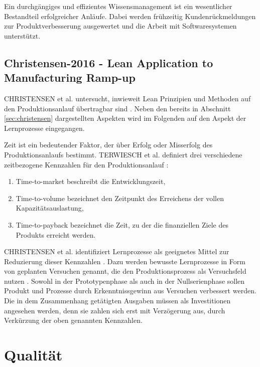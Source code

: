 Ein durchgängiges und effizientes Wissensmanagement ist ein wesentlicher Bestandteil erfolgreicher Anläufe. Dabei werden frühzeitig Kundenrückmeldungen zur Produktverbesserung ausgewertet und die Arbeit mit Softwaresystemen unterstützt. 

\subsection*{Christensen-2016 - Lean Application to Manufacturing Ramp-up}
CHRISTENSEN et al. untersucht, inwieweit Lean Prinzipien und Methoden auf den Produktionsanlauf übertragbar sind \cite{Christensen2016}. Neben den bereits in Abschnitt \ref{sec:christensen} dargestellten Aspekten wird im Folgenden auf den Aspekt der Lernprozesse eingegangen. 


Zeit ist ein bedeutender Faktor, der über Erfolg oder Misserfolg des Produktionsanlaufs bestimmt. TERWIESCH et al. definiert drei verschiedene zeitbezogene Kennzahlen für den Produktionsanlauf \cite{Terwiesch2001}: 
\begin{enumerate}
 \item Time-to-market beschreibt die Entwicklungszeit,
 \item Time-to-volume bezeichnet den Zeitpunkt des Erreichens der vollen Kapazitätsauslastung,
 \item Time-to-payback bezeichnet die Zeit, zu der die finanziellen Ziele des Produkts erreicht werden. 
\end{enumerate}

CHRISTENSEN et al. identifiziert Lernprozesse als geeignetes Mittel zur Reduzierung dieser Kennzahlen \cite{Christensen2016}.
Dazu werden bewusste Lernprozesse in Form von geplanten Versuchen genannt, die den Produktionsprozess als Versuchsfeld nutzen \cite{Terwiesch2001}.  Sowohl in der Prototypenphase als auch in der Nullserienphase sollen Produkt und Prozesse durch Erkenntnissgewinn aus Versuchen verbessert werden. Die in dem Zusammenhang getätigten Ausgaben müssen als Investitionen angesehen werden, denn sie zahlen sich erst mit Verzögerung aus, durch Verkürzung der oben genannten Kennzahlen. 


\section{Qualität}

